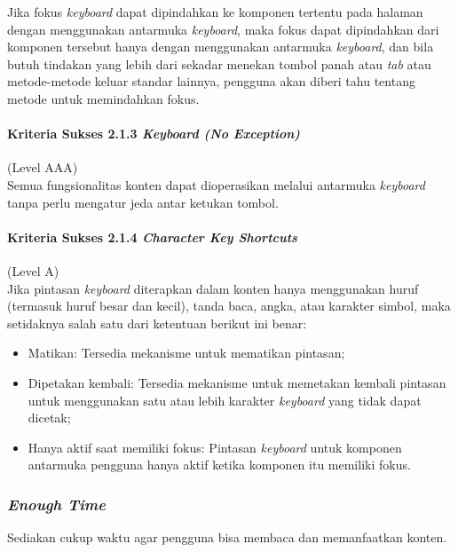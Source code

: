 Jika fokus \textit{keyboard} dapat dipindahkan ke komponen tertentu pada halaman dengan menggunakan antarmuka \textit{keyboard}, maka fokus dapat dipindahkan dari komponen tersebut hanya dengan menggunakan antarmuka \textit{keyboard}, dan bila butuh tindakan yang lebih dari sekadar menekan tombol panah atau \textit{tab} atau metode-metode keluar standar lainnya, pengguna akan diberi tahu tentang metode untuk memindahkan fokus.

\paragraph{Kriteria Sukses 2.1.3 \textit{Keyboard (No Exception)}}
\label{sec:kriteria_sukses_2.1.3}
(Level AAA)\\

Semua fungsionalitas konten dapat dioperasikan melalui antarmuka \textit{keyboard} tanpa perlu mengatur jeda antar ketukan tombol.

\paragraph{Kriteria Sukses 2.1.4 \textit{Character Key Shortcuts}}
\label{sec:kriteria_sukses_2.1.4}
(Level A)\\

Jika pintasan \textit{keyboard} diterapkan dalam konten hanya menggunakan huruf (termasuk huruf besar dan kecil), tanda baca, angka, atau karakter simbol, maka setidaknya salah satu dari ketentuan berikut ini benar:
\begin{itemize}
	\item Matikan: Tersedia mekanisme untuk mematikan pintasan;
	\item Dipetakan kembali: Tersedia mekanisme untuk memetakan kembali pintasan untuk menggunakan satu atau lebih karakter \textit{keyboard} yang tidak dapat dicetak;
	\item Hanya aktif saat memiliki fokus: Pintasan \textit{keyboard} untuk komponen antarmuka pengguna hanya aktif ketika komponen itu memiliki fokus.
\end{itemize}

\subsubsection{\textit{Enough Time}}
\label{sec:enough_time}
Sediakan cukup waktu agar pengguna bisa membaca dan memanfaatkan konten.


